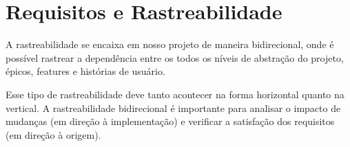 \section[Requisitos e Rastreabilidade]{Requisitos e Rastreabilidade}
A rastreabilidade se encaixa em nosso projeto de maneira bidirecional, onde é
possível rastrear a dependência entre os todos os níveis de abstração do projeto,
épicos, features e histórias de usuário.

Esse tipo de rastreabilidade deve tanto acontecer na forma horizontal quanto
na vertical. A rastreabilidade bidirecional é importante para analisar o impacto
de mudanças
(em direção à implementação) e verificar a satisfação dos
requisitos (em direção à origem).
